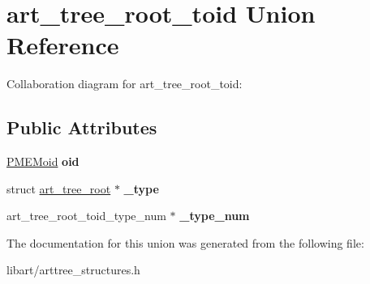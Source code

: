 \hypertarget{unionart__tree__root__toid}{}\section{art\+\_\+tree\+\_\+root\+\_\+toid Union Reference}
\label{unionart__tree__root__toid}


Collaboration diagram for art\+\_\+tree\+\_\+root\+\_\+toid\+:
\subsection*{Public Attributes}
\begin{DoxyCompactItemize}
\item 
\mbox{\label{unionart__tree__root__toid_a7bcb9827ffb1979a1ee1fe984b04e1ce}} 
\hyperlink{structpmemoid}{P\+M\+E\+Moid} {\bfseries oid}
\item 
\mbox{\label{unionart__tree__root__toid_aef2521da5feb66bb0f14adb765149b78}} 
struct \hyperlink{structart__tree__root}{art\+\_\+tree\+\_\+root} $\ast$ {\bfseries \+\_\+type}
\item 
\mbox{\label{unionart__tree__root__toid_ac15d2068d1e5e3d5abc20cc8a9d19fdb}} 
art\+\_\+tree\+\_\+root\+\_\+toid\+\_\+type\+\_\+num $\ast$ {\bfseries \+\_\+type\+\_\+num}
\end{DoxyCompactItemize}


The documentation for this union was generated from the following file\+:\begin{DoxyCompactItemize}
\item 
libart/arttree\+\_\+structures.\+h\end{DoxyCompactItemize}
